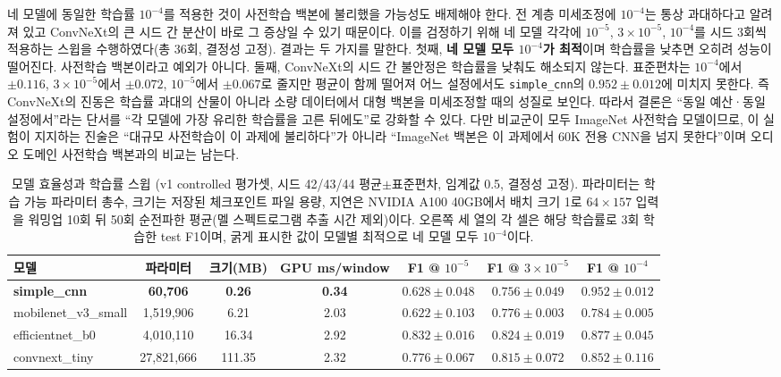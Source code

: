 \documentclass[10pt,twocolumn]{article}
\renewcommand{\emph}[1]{\textbf{#1}}
\begin{document}
네 모델에 동일한 학습률 $10^{-4}$를 적용한 것이 사전학습 백본에 불리했을 가능성도 배제해야
한다. 전 계층 미세조정에 $10^{-4}$는 통상 과대하다고 알려져 있고 ConvNeXt의 큰 시드 간 분산이
바로 그 증상일 수 있기 때문이다. 이를 검정하기 위해 네 모델 각각에 $10^{-5}$, $3\times10^{-5}$,
$10^{-4}$를 시드 3회씩 적용하는 스윕을 수행하였다(총 36회, 결정성 고정). 결과는 두 가지를
말한다. 첫째, \emph{네 모델 모두 $10^{-4}$가 최적}이며 학습률을 낮추면 오히려 성능이 떨어진다.
사전학습 백본이라고 예외가 아니다. 둘째, ConvNeXt의 시드 간 불안정은 학습률을 낮춰도 해소되지
않는다. 표준편차는 $10^{-4}$에서 $\pm0.116$, $3\times10^{-5}$에서 $\pm0.072$, $10^{-5}$에서
$\pm0.067$로 줄지만 평균이 함께 떨어져 어느 설정에서도 \texttt{simple\_cnn}의 $0.952\pm0.012$에
미치지 못한다. 즉 ConvNeXt의 진동은 학습률 과대의 산물이 아니라 소량 데이터에서 대형 백본을
미세조정할 때의 성질로 보인다. 따라서 결론은 ``동일 예산·동일 설정에서''라는 단서를 ``각 모델에
가장 유리한 학습률을 고른 뒤에도''로 강화할 수 있다. 다만 비교군이 모두 ImageNet 사전학습
모델이므로, 이 실험이 지지하는 진술은 ``대규모 사전학습이 이 과제에 불리하다''가 아니라
``ImageNet 백본은 이 과제에서 60K 전용 CNN을 넘지 못한다''이며 오디오 도메인 사전학습
백본과의 비교는 남는다.

\begin{table}[!t]
\centering
\caption{모델 효율성과 학습률 스윕 (v1 controlled 평가셋, 시드 42/43/44 평균$\pm$표준편차,
임계값 0.5, 결정성 고정). 파라미터는 학습 가능 파라미터 총수, 크기는 저장된 체크포인트 파일
용량, 지연은 NVIDIA A100 40GB에서 배치 크기 1로 $64\times157$ 입력을 워밍업 10회 뒤 50회
순전파한 평균(멜 스펙트로그램 추출 시간 제외)이다. 오른쪽 세 열의 각 셀은 해당 학습률로 3회
학습한 test F1이며, 굵게 표시한 값이 모델별 최적으로 네 모델 모두 $10^{-4}$이다.}
\label{tab:model}
\small
\setlength{\tabcolsep}{6pt}
\begin{tabular}{lcccccc}
\toprule
모델 & 파라미터 & 크기(MB) & GPU ms/window & F1 @ $10^{-5}$ & F1 @ $3\times10^{-5}$ & F1 @ $10^{-4}$ \\
\midrule
\textbf{simple\_cnn} & \textbf{60{,}706} & \textbf{0.26} & \textbf{0.34} & $0.628\pm0.048$ & $0.756\pm0.049$ & $\mathbf{0.952\pm0.012}$ \\
mobilenet\_v3\_small & 1{,}519{,}906 & 6.21 & 2.03 & $0.622\pm0.103$ & $0.776\pm0.003$ & $\mathbf{0.784\pm0.005}$ \\
efficientnet\_b0     & 4{,}010{,}110 & 16.34 & 2.92 & $0.832\pm0.016$ & $0.824\pm0.019$ & $\mathbf{0.877\pm0.045}$ \\
convnext\_tiny       & 27{,}821{,}666 & 111.35 & 2.32 & $0.776\pm0.067$ & $0.815\pm0.072$ & $\mathbf{0.852\pm0.116}$ \\
\bottomrule
\end{tabular}
\end{table}
\end{document}
